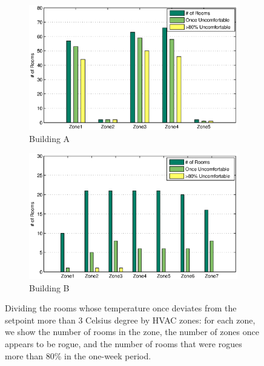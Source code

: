 \begin{figure}[h!]
\centering
	\begin{subfigure}{0.48\textwidth}
                \centering
		\includegraphics[width=\textwidth]{./figs/uncmft_soda.eps}
                \caption{Building A}
	\end{subfigure}
	\begin{subfigure}{0.48\textwidth}
                \centering
		\includegraphics[width=\textwidth]{./figs/uncmft_sdh.eps}
                \caption{Building B}
	\end{subfigure}
\caption{Dividing the rooms whose temperature once deviates from the setpoint more than 3 Celsius degree by HVAC zones: for each zone, we show the number of rooms in the zone, the number of zones once appears to be rogue, and the number of rooms that were rogues more than 80\% in the one-week period.} 
\label{fig:uncmft}
\end{figure}

